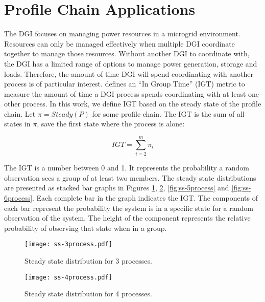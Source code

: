 
\section{Profile Chain Applications}


The DGI focuses on managing power resources in a microgrid environment.
Resources can only be managed effectively when multiple DGI coordinate together to manage those resources.
Without another DGI to coordinate with, the DGI has a limited range of options to manage power generation, storage and loads.
Therefore, the amount of time DGI will spend coordinating with another process is of particular interest.
\cite{CRITIS2012} defines an ``In Group Time'' (IGT) metric to measure the amount of time a DGI process spends coordinating with at least one other process.
In this work, we define IGT based on the steady state of the profile chain.
Let $\pi=Steady(P)$ for some profile chain.
The IGT is the sum of all states in $\pi$, save the first state where the process is alone:

\begin{equation} IGT = \sum_{i=2}^{m} \pi_i \end{equation}

The IGT is a number between 0 and 1.
It represents the probability a random observation sees a group of at least two members.
The steady state distributions are presented as stacked bar graphs in Figures \ref{fig:ss-3process}, \ref{fig:ss-4process}, \ref{fig:ss-5process} and \ref{fig:ss-6process}.
Each complete bar in the graph indicates the IGT.
The components of each bar represent the probability the system is in a specific state for a random observation of the system.
The height of the component represents the relative probability of observing that state when in a group.

\begin{figure}
    \centering
    \texttt{[image: ss-3process.pdf]}
    \caption{Steady state distribution for 3 processes.}
    \label{fig:ss-3process}
\end{figure}

\begin{figure}
    \centering
    \texttt{[image: ss-4process.pdf]}
    \caption{Steady state distribution for 4 processes.}
    \label{fig:ss-4process}
\end{figure}

